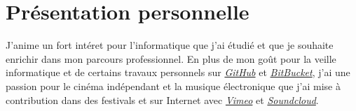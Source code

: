 \section{Présentation personnelle}
J'anime un fort intéret pour l'informatique que j'ai étudié et que
je souhaite enrichir dans mon parcours professionnel.
En plus de mon goût pour la veille informatique et de certains travaux personnels sur
\href{https://github.com/vlnk}{\textit{GitHub}} et \href{https://bitbucket.org/vlnk}{\textit{BitBucket}},
j'ai une passion pour le cinéma indépendant et la musique électronique que
j'ai mise à contribution dans des festivals et sur Internet avec
\href{https://vimeo.com/user3599832}{\textit{Vimeo}} et
\href{https://soundcloud.com/vlnk}{\textit{Soundcloud}}.

